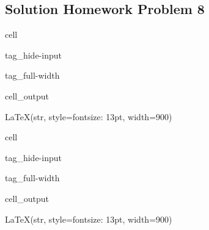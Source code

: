 \documentclass[letterpaper,10pt,english]{jupyterBook}
\begin{document}
\subsection{Solution Homework Problem 8}
\label{\detokenize{content/tutorials/T8/tutorial_08:solution-homework-problem-8}}
\begin{sphinxuseclass}{cell}
\begin{sphinxuseclass}{tag_hide-input}
\begin{sphinxuseclass}{tag_full-width}\begin{sphinxVerbatimOutput}

\begin{sphinxuseclass}{cell_output}
\begin{sphinxVerbatim}[commandchars=\\\{\}]
LaTeX(str, style=\PYGZob{}\PYGZsq{}font\PYGZhy{}size\PYGZsq{}: \PYGZsq{}13pt\PYGZsq{}\PYGZcb{}, width=900)
\end{sphinxVerbatim}

\end{sphinxuseclass}\end{sphinxVerbatimOutput}

\end{sphinxuseclass}
\end{sphinxuseclass}
\end{sphinxuseclass}
\begin{sphinxuseclass}{cell}
\begin{sphinxuseclass}{tag_hide-input}
\begin{sphinxuseclass}{tag_full-width}\begin{sphinxVerbatimOutput}

\begin{sphinxuseclass}{cell_output}
\begin{sphinxVerbatim}[commandchars=\\\{\}]
LaTeX(str, style=\PYGZob{}\PYGZsq{}font\PYGZhy{}size\PYGZsq{}: \PYGZsq{}13pt\PYGZsq{}\PYGZcb{}, width=900)
\end{sphinxVerbatim}

\end{sphinxuseclass}\end{sphinxVerbatimOutput}

\end{sphinxuseclass}
\end{sphinxuseclass}
\end{sphinxuseclass}
\end{document}
